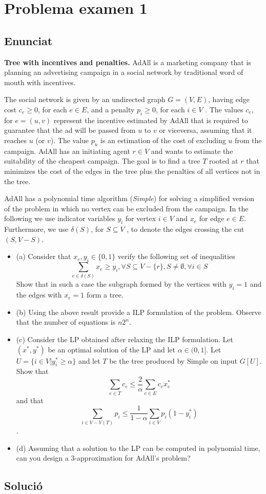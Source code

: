 \section{Problema examen 1}
\subsection{Enunciat}
\textbf{Tree with incentives and penalties.} AdAll is a marketing company that is planning an advertising campaign in a social network by traditional word of mouth with incentives. 

The social network is given by an undirected graph $G = (V,E)$, having edge cost $c_e \geq 0$, for each $e \in E$, and a penalty $p_i \geq 0$, for each $i \in V$ . The values $c_e$, for $e = (u,v)$ represent the incentive estimated by AdAll that is required to guarantee that the ad will be passed from $u$ to $v$ or viceversa, assuming that it reaches $u$ (or $v$). The value $p_u$ is an estimation of the cost of excluding $u$ from the campaign. AdAll has an initiating agent $r \in V$ and wants to estimate the suitability of the cheapest campaign. The goal is to find a tree $T$ rooted at $r$ that minimizes the cost of the edges in the tree plus the penalties of all vertices not in the tree.

AdAll has a polynomial time algorithm (\textit{Simple}) for solving a simplified version of the problem in which no vertex can be excluded from the campaign. In the following we use indicator variables $y_i$ for vertex $i \in V$ and $x_e$ for edge $e \in E$. Furthermore, we use $\delta(S)$, for $S \subseteq V$ , to denote the edges crossing the cut $(S,V-S)$. 

\begin{itemize}
    \item (a) Consider that $x_e,y_i \in \{0,1\}$ verify the following set of inequalities 
    \[
    \sum_{e \in \delta(S)}x_e \ge y_i,  \forall S \subseteq V -\{r\},S \neq \emptyset,\forall i \in S
    \] 
    Show that in such a case the subgraph formed by the vertices with $y_i = 1$ and the edges with $x_e  = 1$ form a tree. 
    \item (b) Using the above result provide a ILP formulation of the problem. Observe that the number of equations is $n2^n$. 
    \item (c) Consider the LP obtained after relaxing the ILP formulation. Let $(x^{*},y^{*})$ be an optimal solution of the LP and let $\alpha \in (0,1]$. Let $U = \{i \in V | y^{*}_i \geq \alpha\}$ and let $T$ be the tree produced by Simple on input $G[U]$. Show that 
    \[
    \sum_{e\in T} c_e \leq \frac{2}{\alpha} \sum_{e\in E} c_e x^{*}_e
    \] 
    and that 
    \[
    \sum_{i \in V-V(T)} p_i \leq \frac{1}{1-\alpha} \sum_{i \in V}p_i(1-y^{*}_i)
    \]. 
    \item (d) Assuming that a solution to the LP can be computed in polynomial time, can you design a 3-approximation for AdAll’s problem?
\end{itemize}

\subsection{Solució}